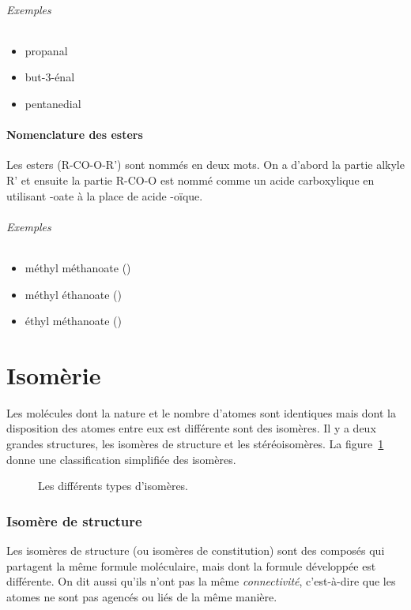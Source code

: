 \paragraph{Exemples}
\begin{itemize}
  \item propanal
  \item but-3-énal
  \item pentanedial
\end{itemize}

\subsection{Nomenclature des esters}
Les esters (R-CO-O-R') sont nommés en deux mots. 
On a d'abord la partie alkyle R' et ensuite la partie R-CO-O est nommé 
comme un acide carboxylique en utilisant -oate à la place de acide -o\"ique.

\paragraph{Exemples}
\begin{itemize}
  \item méthyl méthanoate ()
  \item méthyl éthanoate ()
  \item éthyl méthanoate ()
\end{itemize}

\part{Isomèrie}

Les molécules dont la nature et le nombre d'atomes sont identiques mais dont la disposition des atomes entre eux est différente sont des isomères.
Il y a deux grandes structures, les isomères de structure et les stéréoisomères.
La figure~\ref{fig:classificationIsomerie} donne une classification simplifiée des isomères.

\begin{figure}
  \begin{center}
    
  \end{center}
  \caption{Les différents types d'isomères.}
  \label{fig:classificationIsomerie}
\end{figure}

\section{Isomère de structure}
Les isomères de structure (ou isomères de constitution) sont des composés qui partagent la même formule moléculaire, mais dont la formule développée est différente.
On dit aussi qu'ils n'ont pas la même \emph{connectivité}, c'est-à-dire
que les atomes ne sont pas agencés ou liés de la même manière.

